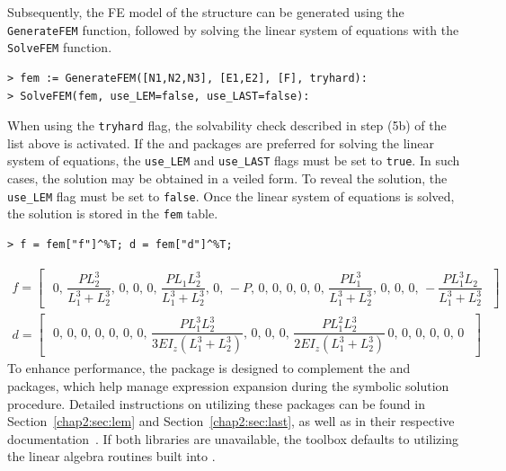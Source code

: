 Subsequently, the \ac{FE} model of the structure can be generated using the \texttt{GenerateFEM} function, followed by solving the linear system of equations with the \texttt{SolveFEM} function.
%
\begin{verbatim}
> fem := GenerateFEM([N1,N2,N3], [E1,E2], [F], tryhard):
> SolveFEM(fem, use_LEM=false, use_LAST=false):
\end{verbatim}
%
When using the \texttt{tryhard} flag, the solvability check described in step (5b) of the list above is activated. If the \LEM{} and \LAST{} packages are preferred for solving the linear system of equations, the \texttt{use\_LEM} and \texttt{use\_LAST} flags must be set to \texttt{true}. In such cases, the solution may be obtained in a veiled form. To reveal the solution, the \texttt{use\_LEM} flag must be set to \texttt{false}. Once the linear system of equations is solved, the solution is stored in the \texttt{fem} table.
%
\begin{verbatim}
> f = fem["f"]^%T; d = fem["d"]^%T;
\end{verbatim}
\begin{equation*}
  \begin{matrix}
    f = \left[\,\begin{matrix}
      \, 0, \, \dfrac{PL_2^3}{L_1^3+L_2^3}, \, 0, \, 0, \, 0, \, \dfrac{PL_1L_2^3}{L_1^3+L_2^3}, \, 0, \, -P, \, 0, \, 0, \, 0, \, 0, \, 0, \, \dfrac{PL_1^3}{L_1^3+L_2^3}, \, 0, \, 0, \, 0, \, -\dfrac{PL_1^3L_2}{L_1^3+L_2^3} \,
    \end{matrix}\,\right] \\[1.5em]
    d = \left[\,\begin{matrix}
      \, 0, \, 0, \, 0, \, 0, \, 0, \, 0, \, 0, \, \dfrac{PL_1^3L_2^3}{3EI_z(L_1^3+L_2^3)}, \, 0, \, 0, \, 0, \, \dfrac{PL_1^2L_2^3}{2EI_z(L_1^3+L_2^3)} \, 0, \, 0, \, 0, \, 0, \, 0, \, 0 \,
    \end{matrix}\,\right]
  \end{matrix}
\end{equation*}
%
To enhance performance, the \TrussMe{} package is designed to complement the \LEM{} and \LAST{} packages, which help manage expression expansion during the symbolic solution procedure. Detailed instructions on utilizing these packages can be found in Section~\ref{chap2:sec:lem} and Section~\ref{chap2:sec:last}, as well as in their respective documentation~\cite{lem, last}. If both libraries are unavailable, the toolbox defaults to utilizing the linear algebra routines built into \Maple{}.

